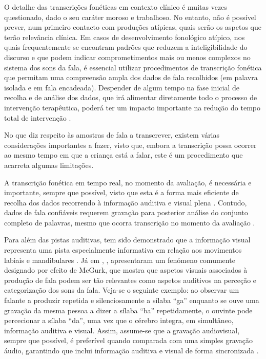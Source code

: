 \documentclass[output=paper,colorlinks,citecolor=brown,booklanguage=portuguese]{langscibook}
\begin{document}
O detalhe das transcrições fonéticas em contexto clínico é muitas vezes questionado, dado o seu caráter moroso e trabalhoso. No entanto, não é possível prever, num primeiro contacto com produções atípicas, quais serão os aspetos que terão relevância clínica. Em casos de desenvolvimento fonológico atípico, nos quais frequentemente se encontram padrões que reduzem a inteligibilidade do discurso e que podem indicar comprometimentos mais ou menos complexos no sistema dos sons da fala, é essencial utilizar procedimentos de transcrição fonética que permitam uma compreensão ampla dos dados de fala recolhidos (em palavra isolada e em fala encadeada). Despender de algum tempo na fase inicial de recolha e de análise dos dados, que irá alimentar diretamente todo o processo de intervenção terapêutica, poderá ter um impacto importante na redução do tempo total de intervenção \citep{Howard2002}.

No que diz respeito às amostras de fala a transcrever, existem várias considerações importantes a fazer, visto que, embora a transcrição possa ocorrer ao mesmo tempo em que a criança está a falar, este é um procedimento que acarreta algumas limitações.

A transcrição fonética em tempo real, no momento da avaliação, é necessária e importante, sempre que possível, visto que esta é a forma mais eficiente de recolha dos dados recorrendo à informação auditiva e visual plena \citep{Bates2017}. Contudo, dados de fala confiáveis requerem gravação para posterior análise do conjunto completo de palavras, mesmo que ocorra transcrição no momento da avaliação \citep{Stemberger2019}.

Para além das pistas auditivas, tem sido demonstrado que a informação visual representa uma pista especialmente informativa em relação aos movimentos labiais e mandibulares \citep{Munhall2004}. Já em \citeyear{McGurk1976}, \citeauthor{McGurk1976}, apresentaram um fenómeno comumente designado por efeito de McGurk, que mostra que aspetos visuais associados à produção de fala podem ser tão relevantes como aspetos auditivos na perceção e categorização dos sons da fala. Veja-se o seguinte exemplo: ao observar um falante a produzir repetida e silenciosamente a sílaba “ga” enquanto se ouve uma gravação da mesma pessoa a dizer a sílaba “ba” repetidamente, o ouvinte pode percecionar a sílaba “da”, uma vez que o cérebro integra, em simultâneo, informação auditiva e visual. Assim, assume-se que a gravação audiovisual, sempre que possível, é preferível quando comparada com uma simples gravação áudio, garantindo que inclui informação auditiva e visual de forma sincronizada \citep{Stemberger2019}.
\end{document}
